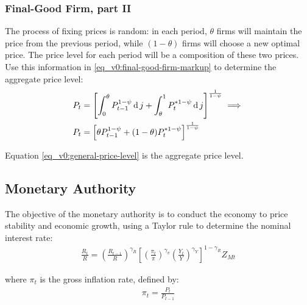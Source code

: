 \documentclass[../thesis.tex]{subfiles}
\begin{document}
	
	\subsubsection{Final-Good Firm, part II}
	
	The process of fixing prices is random: in each period, $\theta$ firms will maintain the price from the previous period, while $(1-\theta)$ firms will choose a new optimal price. The price level for each period will be a composition of these two prices. Use this information in \ref{eq_v0:final-good-firm-markup} to determine the aggregate price level:
	\begin{align}
		P_t & = \left[ \int_{0}^{\theta} P_{t-1}^{1-\psi} \operatorname{d} j + \int_{\theta}^{1} P_t^{\ast 1-\psi} \operatorname{d} j \right]^{\frac{1}{1-\psi}}  \implies \nonumber \\
		P_t & = \left[ \theta P_{t-1}^{1-\psi} + (1-\theta) P_t^{\ast 1-\psi} \right]^\frac{1}{1-\psi} \label{eq_v0:general-price-level}
	\end{align}
	
	Equation \ref{eq_v0:general-price-level} is the aggregate price level.
	
	
	\subsection{Monetary Authority}
	
	The objective of the monetary authority is to conduct the economy to price stability and economic growth, using a Taylor rule \cite{taylor_discretion_1993} to determine the nominal interest rate:
	\begin{align}
		\label{eq_v0:monetary-policy}
		\frac{R_t}{R} =
		\left( \frac{R_{t-1}}{R} \right)^{\gamma_R}  \left[
		\left( \frac{\pi_t}{\pi} \right)^{\gamma_\pi}
		\left( \frac{Y_t}{Y} \right)^{\gamma_Y} \right]^{1-\gamma_R} Z_{Mt}
	\end{align}
	
	where $\pi_t$ is the gross inflation rate, defined by:
	\begin{align}
		\pi_t = \frac{P_t}{P_{t-1}}
		\label{eq_v0:gross-inflation-rate}
	\end{align}
	
\end{document}
